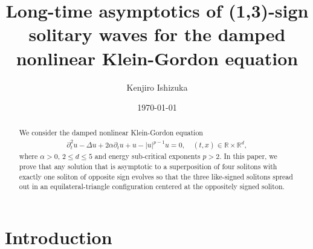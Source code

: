 \documentclass[reqno]{amsart}
\theoremstyle{plain}
\theoremstyle{definition}
\numberwithin{equation}{section}
\newcommand{\1}{\mathbbm{1}}
\begin{document}


\title[]{Long-time asymptotics of (1,3)-sign solitary waves for the damped nonlinear Klein-Gordon equation}
\author[K. Ishizuka]{Kenjiro Ishizuka}
\address[K.Ishizuka]{Azabu Junior and Senior High School, Tokyo, Japan}
\date{\today}
\date{}
\maketitle


\begin{abstract}
We consider the damped nonlinear Klein-Gordon equation
\begin{align*}
\partial_{t}^2u-\Delta u+2\alpha \partial_{t}u+u-|u|^{p-1}u=0, \ & (t,x) \in \mathbb{R} \times \mathbb{R}^d,
\end{align*}
where $\alpha>0$, $2\leq d\leq 5$ and energy sub-critical exponents $p>2$. In this paper, we prove that any solution that is asymptotic to a superposition of four solitons with exactly one soliton of opposite sign evolves so that the three like-signed solitons spread out in an equilateral-triangle configuration centered at the oppositely signed soliton.
\end{abstract}


\tableofcontents



\section{Introduction}
\end{document}
